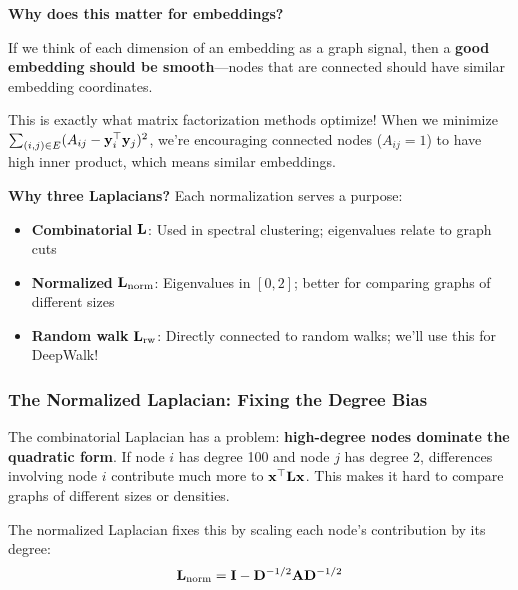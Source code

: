 \begin{notechapter}
\begin{keyinsight}
\textbf{Why does this matter for embeddings?} 

If we think of each dimension of an embedding as a graph signal, then a \textbf{good embedding should be smooth}---nodes that are connected should have similar embedding coordinates. 

This is exactly what matrix factorization methods optimize! When we minimize $\sum_{(i,j) \in E}(A_{ij} - \mathbf{y}_i^\top \mathbf{y}_j)^2$, we're encouraging connected nodes ($A_{ij} = 1$) to have high inner product, which means similar embeddings.
\end{keyinsight}

\begin{keyinsight}
\textbf{Why three Laplacians?} Each normalization serves a purpose:
\begin{itemize}
    \item \textbf{Combinatorial} $\mathbf{L}$: Used in spectral clustering; eigenvalues relate to graph cuts
    \item \textbf{Normalized} $\mathbf{L}_{\text{norm}}$: Eigenvalues in $[0, 2]$; better for comparing graphs of different sizes
    \item \textbf{Random walk} $\mathbf{L}_{\text{rw}}$: Directly connected to random walks; we'll use this for DeepWalk!
\end{itemize}
\end{keyinsight}

\subsubsection*{The Normalized Laplacian: Fixing the Degree Bias}

\begin{whybox}
The combinatorial Laplacian has a problem: \textbf{high-degree nodes dominate the quadratic form}. If node $i$ has degree 100 and node $j$ has degree 2, differences involving node $i$ contribute much more to $\mathbf{x}^\top \mathbf{L} \mathbf{x}$. This makes it hard to compare graphs of different sizes or densities.
\end{whybox}

The normalized Laplacian fixes this by scaling each node's contribution by its degree:
\[
\mathbf{L}_{\text{norm}} = \mathbf{I} - \mathbf{D}^{-1/2} \mathbf{A} \mathbf{D}^{-1/2}
\]


\end{notechapter}
